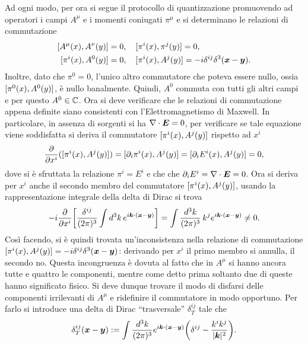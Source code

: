 Ad ogni modo, per ora si segue il protocollo di quantizzazione promuovendo ad operatori i campi $A^\mu$ e i momenti coniugati $\pi^\mu$ e si determinano le relazioni di commutazione
\begin{equation}
\label{eq: regole commutazione campo EM errate}
    \begin{split}
        \comm{A^\mu(x)}{A^\nu(y)} &= 0,\quad \comm{\pi^i(x)}{\pi^j(y)} = 0, \\
        \comm{\pi^i(x)}{A^0(y)} &= 0,\quad \comm{\pi^i(x)}{A^j(y)} = -i\delta^{ij}\delta^3(\vx - \vy).
    \end{split}
\end{equation}
Inoltre, dato che $\pi^0 = 0$, l'unico altro commutatore che poteva essere nullo, ossia $[\pi^0(x),A^0(y)]$, è nullo banalmente. Quindi, $A^0$ commuta con tutti gli altri campi e per questo $A^0\in\mathbb{C}$. Ora si deve verificare che le relazioni di commutazione appena definite siano consistenti con l'Elettromagnetismo di Maxwell. In particolare, in assenza di sorgenti si ha $\nabla\cdot\bm{E} = 0$, per verificare se tale equazione viene soddisfatta si deriva il commutatore $[\pi^i(x),A^j(y)]$ rispetto ad $x^i$
\begin{equation}
    \frac{\partial}{\partial x^i}([\pi^i(x),A^j(y)]) = [\partial_i\pi^i(x),A^j(y)] = [\partial_i E^i(x),A^j(y)] = 0,
\end{equation}
dove si è sfruttata la relazione $\pi^i = E^i$ e che che $\partial_i E^i = \nabla\cdot\bm{E} = 0$. Ora si deriva per $x^i$ anche il secondo membro del commutatore $[\pi^i(x),A^j(y)]$, usando la rappresentazione integrale della delta di Dirac si trova
\begin{equation}
    -i\frac{\partial}{\partial x^i}\bigg[\frac{\delta^{ij}}{(2\pi)^3}\int d^3k\,e^{i\bm{k}\cdot(\bm{x} - \bm{y})}\bigg] = \int \frac{d^3k}{(2\pi)^3}\,k^je^{i\bm{k}\cdot(\bm{x} - \bm{y})} \neq 0.
\end{equation}
Così facendo, si è quindi trovata un'inconsistenza nella relazione di commutazione $[\pi^i(x),A^j(y)] = -i\delta^{ij}\delta^3(\bm{x} - \bm{y})$: derivando per $x^i$ il primo membro si annulla, il secondo no. Questa incongruenza è dovuta al fatto che in $A^\mu$ si hanno ancora tutte e quattro le componenti, mentre come detto prima soltanto due di queste hanno significato fisico. Si deve dunque trovare il modo di disfarsi delle componenti irrilevanti di $A^\mu$ e ridefinire il commutatore in modo opportuno. Per farlo si introduce una delta di Dirac ``trasversale'' $\delta^{ij}_T$ tale che 
\begin{equation}
\label{eq: delta di Dirac trasversale}
    \delta_T^{ij}(\bm{x} - \bm{y}) := \int\frac{d^3k}{(2\pi)^3}e^{i\bm{k}\cdot(\bm{x} - \bm{y})}\bigg(\delta^{ij} - \frac{k^ik^j}{|\bm{k}|^2}\bigg).
\end{equation}
